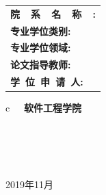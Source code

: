 \vskip 1.0cm
\begin{center}

\renewcommand\arraystretch{1.5}
	\begin{tabular}{l}
		{\sihao \bf 院~~系~~名~~称~~:}\\
		{\sihao \bf 专业学位类别:}\\
		{\sihao \bf 专业学位领域:}\\
		{\sihao \bf 论文指导教师:}\\
		{\sihao \bf 学~位~申~请~人:}
	\end{tabular}
\begin{tabular}c
{\sihao \bf  ~~软件工程学院}               \\
              \\
\\
  \\
      \\
\hline
\end{tabular}


\end{center}

\vskip 2.0cm
\begin{center}
{\sihao 2019年11月}
\end{center}